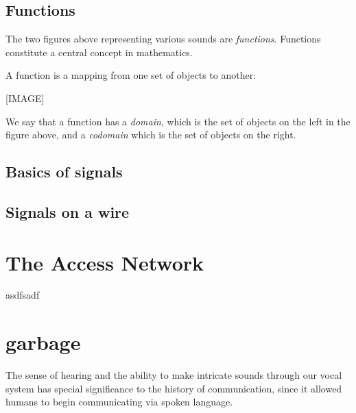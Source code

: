 \documentclass[UTF8]{book}
\begin{document}
\begin{CJK}{UTF8}{gbsn}
\section{Functions}

The two figures above representing various sounds are \emph{functions}. Functions constitute a central concept in mathematics.

A function is a mapping from one set of objects to another:

[IMAGE]

We say that a function has a \emph{domain}, which is the set of objects on the left in the figure above, and a \emph{codomain} which is the set of objects on the right.





\section{Basics of signals}


\section{Signals on a wire}




\chapter{The Access Network}

asdfsadf


\chapter{garbage}

The sense of hearing and the ability to make intricate sounds through our vocal system has special significance to the history of communication, since it allowed humans to begin communicating via spoken language.

\end{CJK}
\end{document}
